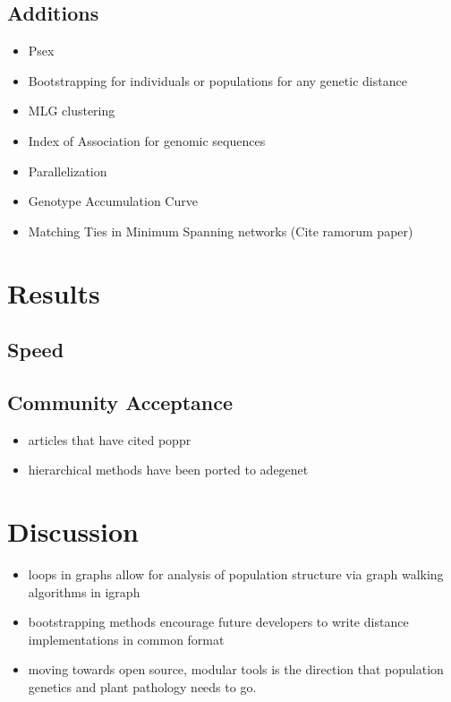 \documentclass{frontiersSCNS} %
\begin{document}
\subsection*{Additions}\label{additions}

\begin{itemize}
\itemsep1pt\parskip0pt
\item
  Psex
\item
  Bootstrapping for individuals or populations for any genetic distance
\item
  MLG clustering
\item
  Index of Association for genomic sequences
\item
  Parallelization
\item
  Genotype Accumulation Curve
\item
  Matching Ties in Minimum Spanning networks (Cite ramorum paper)
\end{itemize}

\section*{Results}\label{results}

\subsection*{Speed}\label{speed}

\subsection*{Community Acceptance}\label{community-acceptance}

\begin{itemize}
\itemsep1pt\parskip0pt
\item
  articles that have cited poppr
\item
  hierarchical methods have been ported to adegenet
\end{itemize}

\section*{Discussion}\label{discussion}

\begin{itemize}
\itemsep1pt\parskip0pt
\item
  loops in graphs allow for analysis of population structure via graph
  walking algorithms in igraph
\item
  bootstrapping methods encourage future developers to write distance
  implementations in common format
\item
  moving towards open source, modular tools is the direction that
  population genetics and plant pathology needs to go.
\end{itemize}
\end{document}
